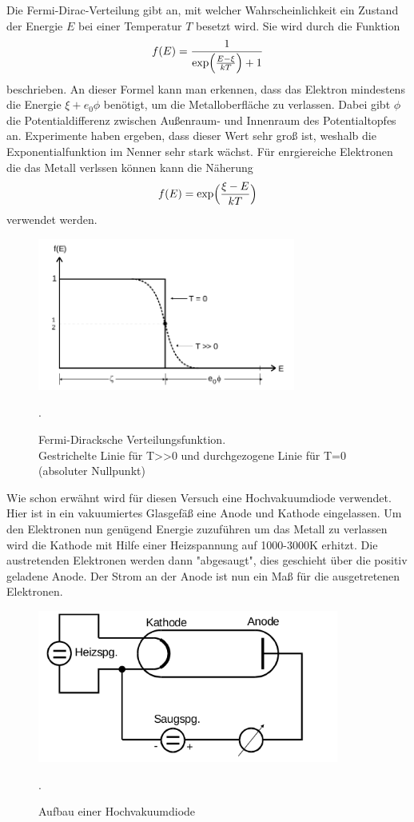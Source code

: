 Die Fermi-Dirac-Verteilung gibt an, mit welcher Wahrscheinlichkeit ein Zustand der
Energie $E$ bei einer Temperatur $T$ besetzt wird. Sie wird durch die Funktion
\begin{equation}
  f(E)=\frac{1}{\exp\Bigl(\frac{E-\xi}{kT}\Bigr)+1}
  \label{eqn:fermi1}
\end{equation}
beschrieben. An dieser Formel kann man erkennen, dass das Elektron mindestens die Energie
$\xi+e_{0}\phi$ benötigt, um die Metalloberfläche zu verlassen. Dabei gibt $\phi$
die Potentialdifferenz zwischen Außenraum- und Innenraum des Potentialtopfes an.
Experimente haben ergeben, dass dieser Wert sehr groß ist, weshalb die
Exponentialfunktion im Nenner sehr stark wächst.
Für enrgiereiche Elektronen die das Metall verlssen können kann die Näherung
\begin{equation}
  f(E)=\exp\Bigl(\frac{\xi-E}{kT}\Bigr)
  \label{eqn:fermi2}
\end{equation}
verwendet werden.

\begin{figure}[H]
  \centering
  \includegraphics[height=5cm]{Fermi.png}
  \caption{Fermi-Diracksche Verteilungsfunktion.\\
  Gestrichelte Linie für T>>0 und durchgezogene Linie für T=0 (absoluter Nullpunkt)}
  \label{fig:fermi}
  \cite{skript}.
\end{figure}

Wie schon erwähnt wird für diesen Versuch eine Hochvakuumdiode verwendet. Hier ist
in ein vakuumiertes Glasgefäß eine Anode und Kathode eingelassen. Um den Elektronen
nun genügend Energie zuzuführen um das Metall zu verlassen wird die Kathode mit Hilfe einer
Heizspannung auf 1000-3000\;K erhitzt. Die austretenden Elektronen werden dann "abgesaugt", dies geschieht
über die positiv geladene Anode. Der Strom an der Anode ist nun ein Maß für die
ausgetretenen Elektronen.

\begin{figure}[H]
  \centering
  \includegraphics[height=5cm]{Aufbau.png}
  \caption{Aufbau einer Hochvakuumdiode}
  \label{fig:vakuum}
  \cite{skript}.
\end{figure}

